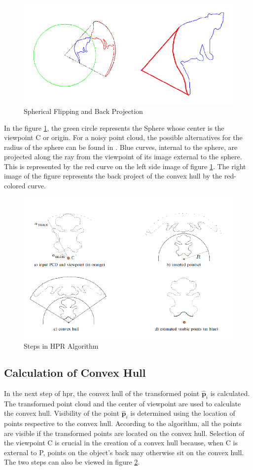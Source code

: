 \begin{figure}[htbp]
    \centering
    \includegraphics[width=0.5\linewidth]{97_graphics/related_work/spherical_flipping.pdf}
    \caption{Spherical Flipping and Back Projection\parencite{katz2007}}
    \label{fig:related_work-spherical_flipping}
\end{figure}

In the figure \ref{fig:related_work-spherical_flipping}, the green circle represents the Sphere whose center is the viewpoint C or origin. For a noisy point cloud, the possible alternatives for the radius of the sphere can be found in \parencite{mehra_visibility_XXXX}. Blue curves, internal to the sphere, are projected along the ray from the viewpoint of its image external to the sphere.  This is represented by the red curve on the left side image of figure \ref{fig:related_work-spherical_flipping}. The right image of the figure represents the back project of the convex hull by the red-colored curve.

\begin{figure}[htb]
    \centering
    \includegraphics[width=0.8\linewidth]{97_graphics/related_work/hpr_2.pdf}
    \caption{Steps in HPR Algorithm \parencite{mehra_visibility_XXXX}}
    \label{fig:realted_work-hpr}
\end{figure}

\subsection{Calculation of Convex Hull}
In the next step of \acrshort{hpr}, the convex hull of the transformed point \(\hat{\mathbf{p}}_i \) is calculated. The transformed point cloud and the center of viewpoint are used to calculate the convex hull. Visibility of the point \(\hat{\mathbf{p}}_i \) is determined using the location of points respective to the convex hull. According to the algorithm, all the points are visible if the transformed points are located on the convex hull. Selection of the viewpoint C is crucial in the creation of a convex hull because, when C is external to P, points on the object's back may otherwise sit on the convex hull. The two steps can also be viewed in figure \ref{fig:realted_work-hpr}.

